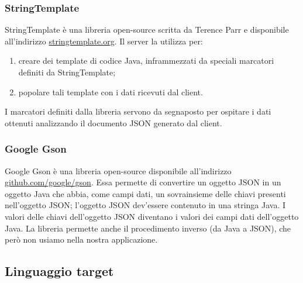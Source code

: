 \subsubsection{StringTemplate}
StringTemplate è una libreria open-source scritta da Terence Parr e disponibile all'indirizzo \url{stringtemplate.org}. Il server la utilizza per:
\begin{enumerate}
	\item creare dei template di codice Java, inframmezzati da speciali marcatori definiti da StringTemplate;
	\item popolare tali template con i dati ricevuti dal client.
\end{enumerate}
I marcatori definiti dalla libreria servono da segnaposto per ospitare i dati ottenuti analizzando il documento JSON generato dal client.

\subsubsection{Google Gson}
Google Gson è una libreria open-source disponibile all'indirizzo \url{github.com/google/gson}. Essa permette di convertire un oggetto JSON in un oggetto Java che abbia, come campi dati, un sovrainsieme delle chiavi presenti nell'oggetto JSON; l'oggetto JSON dev'essere contenuto in una stringa Java. I valori delle chiavi dell'oggetto JSON diventano i valori dei campi dati dell'oggetto Java. La libreria permette anche il procedimento inverso (da Java a JSON), che però non usiamo nella nostra applicazione.




\subsection{Linguaggio target}

